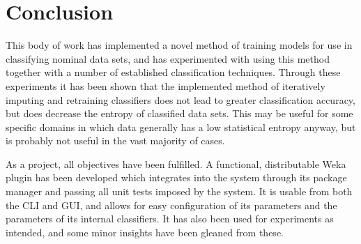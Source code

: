 \newpage
\chapter{Conclusion}
This body of work has implemented a novel method of training models for use in classifying nominal data sets, and has experimented with using this method together with a number of established classification techniques. Through these experiments it has been shown that the implemented method of iteratively imputing and retraining classifiers does not lead to greater classification accuracy, but does decrease the entropy of classified data sets. This may be useful for some specific domains in which data generally has a low statistical entropy anyway, but is probably not useful in the vast majority of cases.

As a project, all objectives have been fulfilled. A functional, distributable Weka plugin has been developed which integrates into the system through its package manager and passing all unit tests imposed by the system. It is usable from both the CLI and GUI, and allows for easy configuration of its parameters and the parameters of its internal classifiers. It has also been used for experiments as intended, and some minor insights have been gleaned from these.